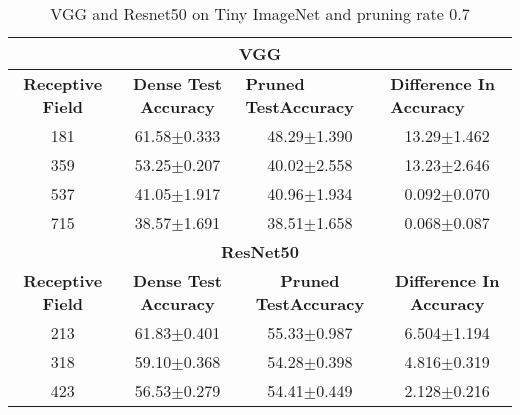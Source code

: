 \begin{table}[H]
\begin{tabular}{@{}cccc@{}}
\toprule
\multicolumn{4}{c}{\textbf{VGG}}                                                                                                                                  \\ \midrule
\textbf{Receptive Field} & \textbf{Dense Test Accuracy} & \multicolumn{1}{l}{\textbf{Pruned  TestAccuracy}} & \multicolumn{1}{l}{\textbf{Difference In Accuracy}} \\ \midrule
181                      & 61.58$\pm$0.333              & 48.29$\pm$1.390                                   & 13.29$\pm$1.462                                     \\
359                      & 53.25$\pm$0.207              & 40.02$\pm$2.558                                   & 13.23$\pm$2.646                                     \\
537                      & 41.05$\pm$1.917              & 40.96$\pm$1.934                                   & 0.092$\pm$0.070                                     \\
715                      & 38.57$\pm$1.691              & 38.51$\pm$1.658                                   & 0.068$\pm$0.087                                     \\ \midrule
\multicolumn{4}{c}{\textbf{ResNet50}}                                                                                                                             \\ \midrule
\textbf{Receptive Field} & \textbf{Dense Test Accuracy} & \textbf{Pruned  TestAccuracy}                     & \textbf{Difference In Accuracy}                     \\
213                      & 61.83$\pm$0.401              & 55.33$\pm$0.987                                   & 6.504$\pm$1.194                                     \\
318                      & 59.10$\pm$0.368              & 54.28$\pm$0.398                                   & 4.816$\pm$0.319                                     \\
423                      & 56.53$\pm$0.279              & 54.41$\pm$0.449                                   & 2.128$\pm$0.216                                     \\ \bottomrule
\end{tabular}
\caption{VGG and Resnet50 on Tiny ImageNet and pruning rate 0.7}
\label{tab:tiny imagenet pruning rate07}
\end{table}

